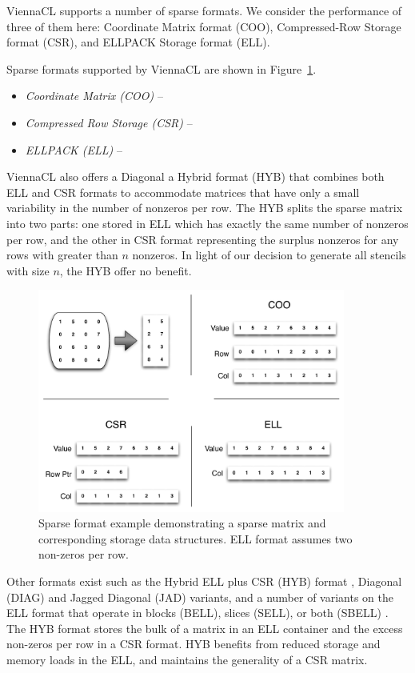 \documentclass{report}
\begin{document}
ViennaCL supports a number of sparse formats. We consider the performance of three of them here: Coordinate Matrix format (COO), Compressed-Row Storage format (CSR), and ELLPACK Storage format (ELL). 

Sparse formats supported by ViennaCL are shown in Figure~\ref{fig:sparse_format}.

\begin{itemize} 
\item \emph{Coordinate Matrix (COO)} -- 
\item \emph{Compressed Row Storage (CSR)} -- 
\item \emph{ELLPACK (ELL)} -- 
\end{itemize}


ViennaCL also offers a Diagonal a Hybrid format (HYB) that combines both ELL and CSR formats to accommodate matrices that have only a small variability in the number of nonzeros per row. The HYB splits the sparse matrix into two parts: one stored in ELL which has exactly the same number of nonzeros per row, and the other in CSR format representing the surplus nonzeros for any rows with greater than $n$ nonzeros. In light of our decision to generate all stencils with size $n$, the HYB offer no benefit.

\begin{figure}
\centering
\includegraphics[width=0.9\textwidth]{gpu_content/omnigraffle/SparseStorage.pdf}
\caption{Sparse format example demonstrating a sparse matrix and corresponding storage data structures. ELL format assumes two non-zeros per row. }
\label{fig:sparse_format}
\end{figure}

Other formats exist such as the Hybrid ELL plus CSR (HYB) format \cite{Bell2009}, Diagonal (DIAG) and Jagged Diagonal (JAD) variants, and a number of variants on the ELL format that operate in blocks (BELL), slices (SELL), or both (SBELL) \cite{SuKeutzer2012}. The HYB format stores the bulk of a matrix in an ELL container and the excess non-zeros per row in a CSR format. HYB benefits from reduced storage and memory loads in the ELL, and maintains the generality of a CSR matrix. 
\end{document}
